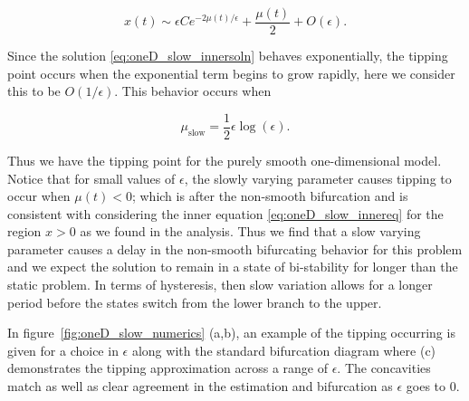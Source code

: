 \begin{equation}\label{eq:oneD_slow_innersoln}
x(t)\sim \epsilon Ce^{-2\mu(t)/\epsilon}+\frac{\mu(t)}{2}+O(\epsilon).
\end{equation}

Since the solution \eqref{eq:oneD_slow_innersoln} behaves exponentially, the tipping point occurs when the exponential term begins to grow rapidly, here we consider this to be $O(1/\epsilon)$. This behavior occurs when

\begin{equation}\label{eq:oneD_slow_tipping}
\mu_{\text{slow}}= \frac{1}{2}\epsilon \log (\epsilon).
\end{equation}

Thus we have the tipping point for the purely smooth one-dimensional model. Notice that for small values of $\epsilon$, the slowly varying parameter causes tipping to occur when $\mu(t)<0$; which is after the non-smooth bifurcation and is consistent with considering the inner equation \eqref{eq:oneD_slow_innereq} for the region $x>0$ as we found in the analysis. Thus we find that a slow varying parameter causes a delay in the non-smooth bifurcating behavior for this problem and we expect the solution to remain in a state of bi-stability for longer than the static problem. In terms of hysteresis, then slow variation allows for a longer period before the states switch from the lower branch to the upper.

In figure~\ref{fig:oneD_slow_numerics} (a,b), an example of the tipping occurring is given for a choice in $\epsilon$ along with the standard bifurcation diagram where (c) demonstrates the tipping approximation across a range of $\epsilon$. The concavities match as well as clear agreement in the estimation and bifurcation as $\epsilon$ goes to 0.


